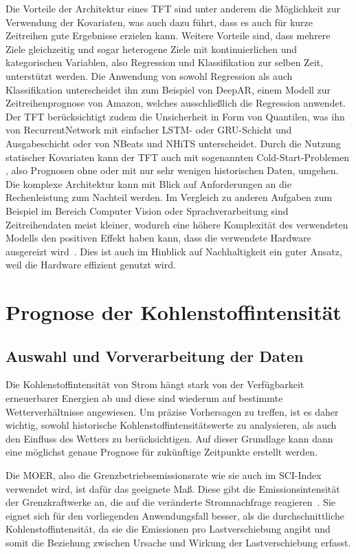 Die Vorteile der Architektur eines \ac{TFT} sind unter anderem die Möglichkeit zur Verwendung der Kovariaten, was auch dazu führt, dass es auch für kurze Zeitreihen gute Ergebnisse erzielen kann.
Weitere Vorteile sind, dass mehrere Ziele gleichzeitig und sogar heterogene Ziele mit kontinuierlichen und kategorischen Variablen, also Regression und Klassifikation zur selben Zeit, unterstützt werden.
Die Anwendung von sowohl Regression als auch Klassifikation unterscheidet ihn zum Beispiel von DeepAR, einem Modell zur Zeitreihenprognose von Amazon, welches ausschließlich die Regression anwendet.
Der \ac{TFT} berücksichtigt zudem die Unsicherheit in Form von Quantilen, was ihn von RecurrentNetwork mit einfacher \ac{LSTM}- oder \ac{GRU}-Schicht und Ausgabeschicht oder von NBeats und NHiTS unterscheidet.
Durch die Nutzung statischer Kovariaten kann der \ac{TFT} auch mit sogenannten \glqq Cold-Start-Problemen \grqq{}, also Prognosen ohne oder mit nur sehr wenigen historischen Daten, umgehen.
Die komplexe Architektur kann mit Blick auf Anforderungen an die Rechenleistung zum Nachteil werden.
Im Vergleich zu anderen Aufgaben zum Beispiel im Bereich Computer Vision oder Sprachverarbeitung sind Zeitreihendaten meist kleiner, wodurch eine höhere Komplexität des verwendeten Modells den positiven Effekt haben kann, dass die verwendete Hardware ausgereizt wird~\cite{PytorchForecastingDocumentation.20230410T20:05:43.000Z}.
Dies ist auch im Hinblick auf Nachhaltigkeit ein guter Ansatz, weil die Hardware effizient genutzt wird.
\chapter{Prognose der Kohlenstoffintensität}\label{CAP:prediction}
\section{Auswahl und Vorverarbeitung der Daten}\label{CAP:data-preparation-analysis}
Die Kohlenstoffintensität von Strom hängt stark von der Verfügbarkeit erneuerbarer Energien ab und diese sind wiederum auf bestimmte Wetterverhältnisse angewiesen.
Um präzise Vorhersagen zu treffen, ist es daher wichtig, sowohl historische Kohlenstoffintensitätswerte zu analysieren, als auch den Einfluss des Wetters zu berücksichtigen.
Auf dieser Grundlage kann dann eine möglichst genaue Prognose für zukünftige Zeitpunkte erstellt werden.

Die \ac{MOER}, also die Grenzbetriebsemissionsrate wie sie auch im SCI-Index verwendet wird, ist dafür das geeignete Maß.
Diese gibt die Emissionsintensität der Grenzkraftwerke an, die auf die veränderte Stromnachfrage reagieren~\cite{Buchanan.2023}.
Sie eignet sich für den vorliegenden Anwendungsfall besser, als die durchschnittliche Kohlenstoffintensität, da sie die Emissionen pro Lastverschiebung angibt und somit die Beziehung zwischen Ursache und Wirkung der Lastverschiebung erfasst\cite{Wiesner.2021}.

